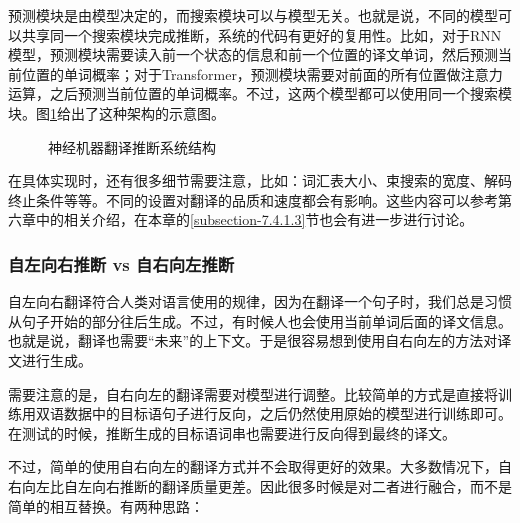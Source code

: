 \parinterval 预测模块是由模型决定的，而搜索模块可以与模型无关。也就是说，不同的模型可以共享同一个搜索模块完成推断，系统的代码有更好的复用性。比如，对于RNN模型，预测模块需要读入前一个状态的信息和前一个位置的译文单词，然后预测当前位置的单词概率；对于Transformer，预测模块需要对前面的所有位置做注意力运算，之后预测当前位置的单词概率。不过，这两个模型都可以使用同一个搜索模块。图\ref{fig:7-19}给出了这种架构的示意图。

\begin{figure}[htp]
\centering

\caption{神经机器翻译推断系统结构}
\label{fig:7-19}
\end{figure}

\parinterval 在具体实现时，还有很多细节需要注意，比如：词汇表大小、束搜索的宽度、解码终止条件等等。不同的设置对翻译的品质和速度都会有影响。这些内容可以参考第六章中的相关介绍，在本章的\ref{subsection-7.4.1.3}节也会有进一步进行讨论。


\subsubsection{自左向右推断 vs 自右向左推断}

\parinterval 自左向右翻译符合人类对语言使用的规律，因为在翻译一个句子时，我们总是习惯从句子开始的部分往后生成。不过，有时候人也会使用当前单词后面的译文信息。也就是说，翻译也需要``未来''的上下文。于是很容易想到使用自右向左的方法对译文进行生成。

\parinterval 需要注意的是，自右向左的翻译需要对模型进行调整。比较简单的方式是直接将训练用双语数据中的目标语句子进行反向，之后仍然使用原始的模型进行训练即可。在测试的时候，推断生成的目标语词串也需要进行反向得到最终的译文。

\parinterval 不过，简单的使用自右向左的翻译方式并不会取得更好的效果。大多数情况下，自右向左比自左向右推断的翻译质量更差。因此很多时候是对二者进行融合，而不是简单的相互替换。有两种思路：

